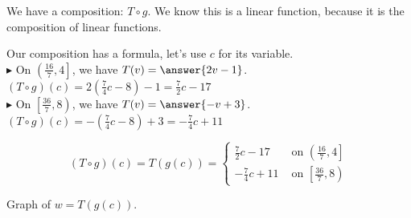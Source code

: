 \documentclass{ximera}
\begin{document}
We have a composition: $T \circ g$.  We know this is a linear function, because it is the composition of linear functions. \\



\begin{explanation}
Our composition has a formula, let's use $c$ for its variable. \\


$\blacktriangleright$ On $\left(\frac{16}{7}, 4\right]$, we have $T(v) = \answer{2v - 1}$.  \\



$(T \circ g)(c) = 2\left( \frac{7}{4}c - 8 \right) - 1 = \frac{7}{2}c - 17$ \\





$\blacktriangleright$ On $\left[\frac{36}{7}, 8\right)$,  we have $T(v) = \answer{-v + 3}$. \\

$(T \circ g)(c) = -\left(\frac{7}{4}c - 8\right) + 3 = -\frac{7}{4}c + 11$










\[
(T \circ g)(c) = T(g(c)) = 
\begin{cases}
  \frac{7}{2}c - 17     &     \text{ on }  \left(\frac{16}{7}, 4\right] \\
  -\frac{7}{4}c + 11   &     \text{ on }  \left[\frac{36}{7}, 8\right)
\end{cases}
\]




\end{explanation}










Graph of $w = T(g(c))$.
\end{document}
